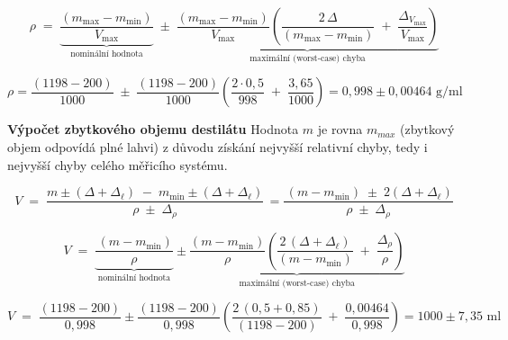 \begin{equation}
\rho \;=\;
\underbrace{
\frac{(m_{\max}-m_{\min})}{V_{\max}}
}_{\text{nominální hodnota}}
\;\pm\;
\underbrace{
\frac{(m_{\max}-m_{\min})}{V_{\max}}
\left(
   \frac{2\,\Delta}{(m_{\max}-m_{\min})} \;+\; \frac{\Delta_{V_{\max}}}{V_{\max}}
\right)
}_{\text{maximální (worst-case) chyba}}
     \label{objem_kapalinaaa}
\end{equation}

\begin{equation}
\rho = \frac{(1198-200)}{1000}
\;\pm\;
\frac{(1198-200)}{1000}
\left(
   \frac{2 \cdot 0,5}{998} \;+\; \frac{3,65}{1000}
\right) = 0,998 \pm 0,00464 \text{ g/ml}
     \label{objem_kapalinaa}
\end{equation}

\noindent\textbf{Výpočet zbytkového objemu destilátu} 
\smallskip
\newline
Hodnota $m$ je rovna $m_{max}$ (zbytkový objem odpovídá plné lahvi) z důvodu získání nejvyšší relativní chyby, tedy i nejvyšší chyby celého měřicího systému.

\begin{equation}
V \;=\;
\frac{m \pm (\Delta + \Delta_\ell) \;-\; m_{\min} \pm (\Delta + \Delta_\ell)}
     {\rho \;\pm\; \Delta_\rho}\, = 
\frac{\,(m-m_{\min}) \;\pm\; 2(\Delta + \Delta_\ell)}
     {\rho \;\pm\; \Delta_\rho}
 \end{equation}

 \begin{equation}
V \;=\;
\underbrace{
\frac{\,(m-m_{\min})}
     {\rho} 
 }_{\text{nominální hodnota}}
 \pm
 \underbrace{
 \frac{(m-m_{\min})}{\rho}
\left(
   \frac{2\,(\Delta+\Delta_\ell)}{(m-m_{\min})} \;+\; \frac{\Delta_\rho}{\rho}
\right)
}_{\text{maximální (worst-case) chyba}}
 \end{equation}

 \begin{equation}
V \;=\;
\frac{(1198-200)}{0,998}
\pm
 \frac{(1198-200)}{0,998}
\left(
   \frac{2\,(0,5+0,85)}{(1198-200)} \;+\; \frac{0,00464}{0,998}
\right) = 1000 \pm 7,35 \text{ ml}
\label{vypočet_objemu}
 \end{equation}

